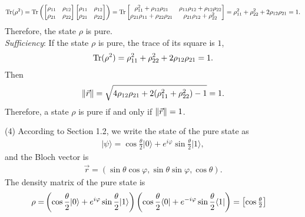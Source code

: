 \documentclass[en]{sol-man}
\begin{document}
\begin{sol}
    \begin{align}
        \operatorname{Tr}(\rho^2)=\operatorname{Tr}\left(\begin{bmatrix}
            \rho_{11}&\rho_{12}\\
            \rho_{21}&\rho_{22}
        \end{bmatrix}\begin{bmatrix}
            \rho_{11}&\rho_{12}\\
            \rho_{21}&\rho_{22}
        \end{bmatrix}\right)=\operatorname{Tr}\begin{bmatrix}
            \rho_{11}^2+\rho_{12}\rho_{21}&\rho_{11}\rho_{12}+\rho_{12}\rho_{22}\\
            \rho_{21}\rho_{11}+\rho_{22}\rho_{21}&\rho_{21}\rho_{12}+\rho_{22}^2
        \end{bmatrix}=\rho_{11}^2+\rho_{22}^2+2\rho_{12}\rho_{21}=1.
    \end{align}
    Therefore, the state $\rho$ is pure.\\
    \emph{Sufficiency}: If the state $\rho$ is pure, the trace of its square is $1$,
    \begin{align}
        \operatorname{Tr}(\rho^2)=\rho_{11}^2+\rho_{22}^2+2\rho_{12}\rho_{21}=1.
    \end{align}
    Then
    \begin{align}
        \left\lVert\vec{r}\right\rVert=\sqrt{4\rho_{12}\rho_{21}+2(\rho_{11}^2+\rho_{22}^2)-1}=1.
    \end{align}
    Therefore, a state $\rho$ is pure if and only if $\left\lVert\vec{r}\right\rVert=1$.
    \item[(4)] According to Section 1.2, we write the state of the pure state as
    \begin{align}
        \lvert\psi\rangle=\cos\frac{\theta}{2}\lvert 0\rangle+e^{i\varphi}\sin\frac{\theta}{2}\lvert 1\rangle,
    \end{align}
    and the Bloch vector is
    \begin{align}
        \vec{r}=(\sin\theta\cos\varphi,\sin\theta\sin\varphi,\cos\theta).
    \end{align}
    The density matrix of the pure state is
    \begin{align}
        \notag\rho=&\left(\cos\frac{\theta}{2}\lvert 0\rangle+e^{i\varphi}\sin\frac{\theta}{2}\lvert 1\rangle\right)\left(\cos\frac{\theta}{2}\langle 0\rvert+e^{-i\varphi}\sin\frac{\theta}{2}\langle 1\rvert\right)=\begin{bmatrix}
            \cos\frac{\theta}{2}\\

\end{bmatrix}
\end{align}
\end{sol}
\end{document}
